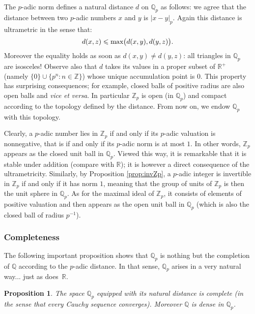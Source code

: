\documentclass[11pt]{article}
\numberwithin{equation}{section}
\numberwithin{figure}{section}
\renewcommand{\leq}{\leqslant}
\newtheorem{prop}[theo]{Proposition}
\theoremstyle{definition}
\newcommand{\Z}{\mathbb Z}
\newcommand{\Zp}{\Z_p}
\newcommand{\Q}{\mathbb Q}
\newcommand{\Qp}{\Q_p}
\newcommand{\R}{\mathbb R}
\renewcommand{\max}{\text{\rm max}}
\begin{document}
The $p$-adic norm defines a natural distance $d$ on $\Q_p$ as follows: 
we agree that the distance between two $p$-adic numbers $x$ and $y$ is 
$|x-y|_p$. Again this distance is ultrametric in the sense that:
$$d(x,z) \leq \max\big( d(x,y), d(y,z)\big).$$
Moreover the equality holds as soon as $d(x,y) \neq d(y,z)$: all 
triangles in $\Qp$ are isosceles!
Observe also that $d$ takes its values in a proper subset of $\R^+$
(namely $\{0\} \cup \{p^n : n \in \Z\}$) whose unique accumulation point 
is $0$. This property has surprising consequences; for example, closed
balls of positive radius are also open balls and \emph{vice et versa}. 
In particular $\Zp$ is open (in $\Qp$) and compact according to the 
topology defined by the distance. From now on, we endow $\Qp$ with this 
topology.

Clearly, a $p$-adic number lies in $\Z_p$ if and only if its $p$-adic 
valuation is nonnegative, that is if and only if its $p$-adic norm is at 
most $1$. In other words, $\Z_p$ appears as the closed unit ball in 
$\Q_p$. Viewed this way, it is remarkable that it is stable under 
addition (compare with $\R$); it is however a direct consequence of the 
ultrametricity. Similarly, by Proposition \ref{prop:invZp}, a $p$-adic 
integer is invertible in $\Zp$ if and only if it has norm $1$, meaning 
that the group of units of $\Zp$ is then the unit sphere in $\Qp$. As 
for the maximal ideal of $\Z_p$, it consists of elements of positive 
valuation and then appears as the open unit ball in $\Q_p$ (which is
also the closed ball of radius $p^{-1}$).

\subsubsection{Completeness}

The following important proposition shows that $\Qp$ is nothing but the 
completion of $\Q$ according to the $p$-adic distance. In that sense, 
$\Qp$ arises in a very natural way... just as does~$\R$.

\begin{prop}
The space $\Q_p$ equipped with its natural distance is complete
(in the sense that every Cauchy sequence converges). Moreover $\Q$
is dense in $\Q_p$.
\end{prop}
\end{document}
